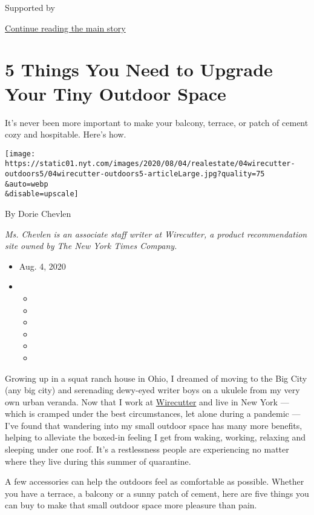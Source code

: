 Supported by

\protect\hyperlink{after-sponsor}{Continue reading the main story}

\hypertarget{5-things-you-need-to-upgrade-your-tiny-outdoor-space}{%
\section{5 Things You Need to Upgrade Your Tiny Outdoor
Space}\label{5-things-you-need-to-upgrade-your-tiny-outdoor-space}}

It's never been more important to make your balcony, terrace, or patch
of cement cozy and hospitable. Here's how.

\texttt{[image: https://static01.nyt.com/images/2020/08/04/realestate/04wirecutter-outdoors5/04wirecutter-outdoors5-articleLarge.jpg?quality=75\\\&auto=webp\\\&disable=upscale]}

By Dorie Chevlen

\emph{Ms. Chevlen is an associate staff writer at Wirecutter, a product
recommendation site owned by The New York Times Company.}

\begin{itemize}
\item
  Aug. 4, 2020
\item
  \begin{itemize}
  \item
  \item
  \item
  \item
  \item
  \item
  \end{itemize}
\end{itemize}

Growing up in a squat ranch house in Ohio, I dreamed of moving to the
Big City (any big city) and serenading dewy-eyed writer boys on a
ukulele from my very own urban veranda. Now that I work at
\href{http://www.nytimes.com/wirecutter?utm_source=nytimes\&utm_medium=referral\&utm_campaign=outdoor-space}{Wirecutter}
and live in New York --- which is cramped under the best circumstances,
let alone during a pandemic --- I've found that wandering into my small
outdoor space has many more benefits, helping to alleviate the boxed-in
feeling I get from waking, working, relaxing and sleeping under one
roof. It's a restlessness people are experiencing no matter where they
live during this summer of quarantine.

A few accessories can help the outdoors feel as comfortable as possible.
Whether you have a terrace, a balcony or a sunny patch of cement, here
are five things you can buy to make that small outdoor space more
pleasure than pain.

